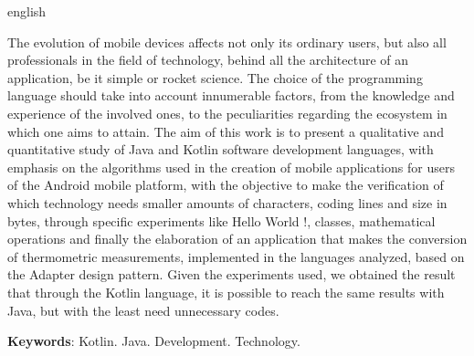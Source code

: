 \setlength{\absparsep}{18pt} %
\begin{resumo}[Abstract]
	
	\begin{otherlanguage*}{english}
		
		
		
The evolution of mobile devices affects not only its ordinary users, but also all professionals in the field of technology, behind all the architecture of an application, be it simple or rocket science. The choice of the programming language should take into account innumerable factors, from the knowledge and experience of the involved ones, to the peculiarities regarding the ecosystem in which one aims to attain. The aim of this work is to present a qualitative and quantitative study of Java and Kotlin software development languages, with emphasis on the algorithms used in the creation of mobile applications for users of the Android mobile platform, with the objective to make the verification of which technology needs smaller amounts of characters, coding lines and size in bytes, through specific experiments like Hello World !, classes, mathematical operations and finally the elaboration of an application that makes the conversion of thermometric measurements, implemented in the languages analyzed, based on the Adapter design pattern. Given the experiments used, we obtained the result that through the Kotlin language, it is possible to reach the same results with Java, but with the least need unnecessary codes.
		
		\vspace{\onelineskip}
		 
		\textbf{Keywords}: Kotlin. Java. Development. Technology.
		
	\end{otherlanguage*}

\end{resumo} 